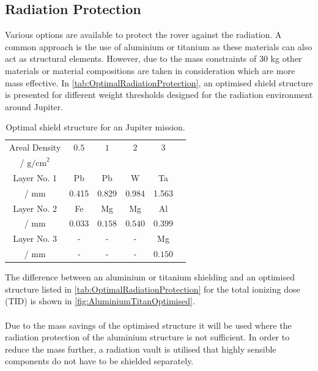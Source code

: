 \subsection{Radiation Protection}

\label{subsec:RadiationProtection}

Various options are available to protect the rover against the radiation. A common approach is the use of aluminium or titanium as these materials can also act as structural elements. However, due to the mass constraints of 30 kg other materials or material compositions are taken in consideration which are more mass effective. In \autoref{tab:OptimalRadiationProtection}, an optimised shield structure is presented for different weight thresholds designed for the radiation environment around Jupiter.

\begin{table}
\centering
\caption{Optimal shield structure for an Jupiter mission. \cite{Platzhalter}}
\begin{adjustbox}{max width=\textwidth}
\begin{tabular}[l]{cccccc}

	\toprule
	
	Areal Density	&	\(0.5\)	&	\(1\) &  \(2\) & \(3\)	\\
	/ \(\text{g/cm}^2\)	&	&	&  & \\
	
	\midrule
	
	
	Layer No. 1	&	Pb &  Pb & W	& Ta	\\
	/ mm	&	0.415 &  0.829 & 0.984	& 1.563	\\
	
	
	Layer No. 2	&	Fe	&  Mg &	Mg & Al \\
	/ mm	&	\(0.033\)	&  \(0.158\) &	\(0.540\) & \(0.399\) \\
	
	
	Layer No. 3 &	-	&  -	& - & Mg \\
	/ mm &	-	&  -	& - & \(0.150\) \\
	

	\bottomrule

\end{tabular}
\end{adjustbox}
\label{tab:OptimalRadiationProtection}
\end{table}

The difference between an aluminium or titanium shielding and an optimised structure listed in \autoref{tab:OptimalRadiationProtection} for the total ionizing dose (TID) is shown in \autoref{fig:AluminiumTitanOptimised}. \\ \\
Due to the mass savings of the optimised structure it will be used where the radiation protection of the aluminium structure is not sufficient. In order to reduce the mass further, a radiation vault is utilised that highly sensible components do not have to be shielded separately.


